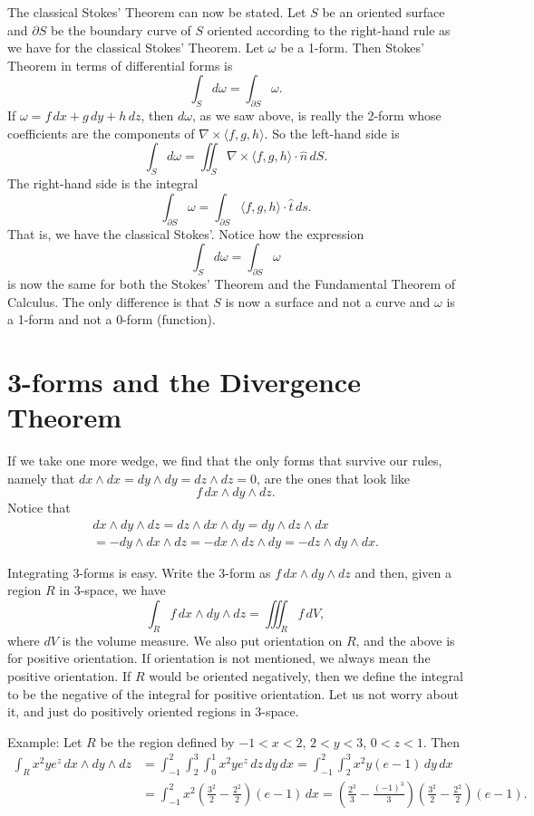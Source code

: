 \documentclass[12pt]{article}
\begin{document}
The classical Stokes' Theorem can now be stated.  Let $S$ be an oriented
surface and $\partial S$ be the boundary curve of $S$ oriented according to
the right-hand rule as we have for the classical Stokes' Theorem.
Let $\omega$ be a 1-form.  Then Stokes' Theorem in terms of
differential forms is
\[
\int_S d \omega = \int_{\partial S} \omega .
\]
If $\omega = f \, dx + g \, dy + h \, dz$, then
$d \omega$, as we saw above, is really the 2-form whose coefficients are
the components of $\nabla \times \langle f , g, h \rangle$.
So the left-hand side is
\[
\int_S d \omega = \iint_S 
\nabla \times \langle f , g, h \rangle \cdot \hat{n} \, dS .
\]
The right-hand side is the integral 
\[
\int_{\partial S} \omega =
\int_{\partial S} 
\langle f , g, h \rangle \cdot \hat{t} \, ds .
\]
That is,
we have the classical Stokes'.
Notice how the expression
\[
\int_S d \omega = \int_{\partial S} \omega
\]
is now the same for both the Stokes' Theorem and the Fundamental Theorem of
Calculus.  The only difference is that $S$ is now a surface and not a curve and 
$\omega$ is a 1-form and not a 0-form (function).

\section*{3-forms and the Divergence Theorem}

If we take one more wedge, we find that the only forms that survive our
rules, namely that $dx \wedge dx = dy \wedge dy = dz \wedge dz = 0$,
are the ones that look like
\[
f \, dx \wedge dy \wedge dz .
\]
Notice that
\begin{multline*}
dx \wedge dy \wedge dz
=
dz \wedge dx \wedge dy
=
dy \wedge dz \wedge dx
\\
=
- 
dy \wedge dx \wedge dz
=
-
dx \wedge dz \wedge dy
=
-
dz \wedge dy \wedge dx .
\end{multline*}

Integrating 3-forms is easy.  Write the 3-form as $f \, dx \wedge dy \wedge
dz$ and then, given a region $R$ in 3-space, we have
\[
\int_R f \, dx \wedge dy \wedge dz
=
\iiint_R f\, dV ,
\]
where $dV$ is the volume measure.  We also put orientation on $R$, and
the above is for positive orientation.  If orientation is not mentioned, we
always mean the positive orientation.  If $R$ would be
oriented negatively, then we define the integral
to be the negative of the integral for positive orientation.
Let us not worry about it, and just do positively oriented
regions in 3-space.

Example:  Let $R$ be the region defined by $-1 < x < 2$, $2 < y < 3$, $0<z<1$.
Then
\begin{equation*}
\begin{split}
\int_R x^2 y e^z \, dx \wedge dy \wedge dz
& =
\int_{-1}^2 \int_2^3 \int_0^1 
x^2 y e^z \, dz \, dy \, dx
=
\int_{-1}^2 \int_2^3 
x^2 y (e-1) \, dy \, dx
\\
& =
\int_{-1}^2
x^2 \left(\frac{3^2}{2} - \frac{2^2}{2}\right) (e-1) \, dx
=
\left( \frac{2^3}{3} - \frac{(-1)^3}{3} \right) \left(\frac{3^2}{2} -
\frac{2^2}{2}\right) (e-1) .
\end{split}
\end{equation*}
\end{document}
